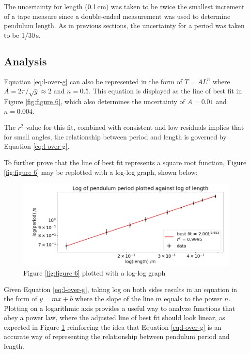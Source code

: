\documentclass[12pt]{article}
\begin{document}
{The uncertainty for length (0.1\,cm) was taken to be twice the smallest increment of a tape measure since a double-ended measurement was used to determine pendulum length. As in previous sections, the uncertainty for a period was taken to be 1/30\,s.

\newpage

\subsection{Analysis}
Equation \ref{eq:l-over-g} can also be represented in the form of $T = AL^n$ where $A = 2\pi/\sqrt{g} \approx 2$ and $n = 0.5$. This equation is displayed as the line of best fit in Figure \ref{fig:figure 6}, which also determines the uncertainty of $A = 0.01$ and $n = 0.004$.

The $r^2$ value for this fit, combined with consistent and low residuals implies that for small angles, the relationship between period and length is governed by Equation \ref{eq:l-over-g}.

To further prove that the line of best fit represents a square root function, Figure \ref{fig:figure 6} may be replotted with a log-log graph, shown below:

\begin{figure}[!hptb]
    \centering
    \includegraphics[width=\textwidth]{../figures/period_vs_length_log.png}
    \caption[]{Figure \ref{fig:figure 6} plotted with a log-log graph}
    \label{fig:figure 7}
\end{figure}

Given Equation \ref{eq:l-over-g}, taking log on both sides results in an equation in the form of $y = mx + b$ where the slope of the line $m$ equals to the power $n$. Plotting on a logarithmic axis provides a useful way to analyze functions that obey a power law, where the adjusted line of best fit should look linear, as expected in Figure \ref{fig:figure 7} reinforcing the idea that Equation \ref{eq:l-over-g} is an accurate way of representing the relationship between pendulum period and length.

}
\end{document}
